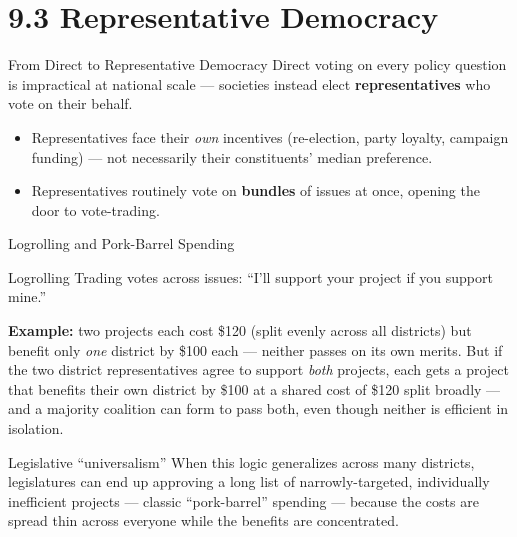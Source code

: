 \documentclass[11pt,aspectratio=169]{beamer}
\begin{document}
\section{9.3 Representative Democracy}

\begin{frame}{From Direct to Representative Democracy}
  Direct voting on every policy question is impractical at national scale --- societies instead elect \textbf{representatives} who vote on their behalf.
  \begin{itemize}
    \item Representatives face their \emph{own} incentives (re-election, party loyalty, campaign funding) --- not necessarily their constituents' median preference.
    \item Representatives routinely vote on \textbf{bundles} of issues at once, opening the door to vote-trading.
  \end{itemize}
\end{frame}

\begin{frame}{Logrolling and Pork-Barrel Spending}
  \begin{block}{Logrolling}
    Trading votes across issues: ``I'll support your project if you support mine.''
  \end{block}
  \small \textbf{Example:} two projects each cost \$120 (split evenly across all districts) but benefit only \emph{one} district by \$100 each --- neither passes on its own merits. But if the two district representatives agree to support \emph{both} projects, each gets a project that benefits their own district by \$100 at a shared cost of \$120 split broadly --- and a majority coalition can form to pass both, even though neither is efficient in isolation.
  \begin{alertblock}{Legislative ``universalism''}
    When this logic generalizes across many districts, legislatures can end up approving a long list of narrowly-targeted, individually inefficient projects --- classic ``pork-barrel'' spending --- because the costs are spread thin across everyone while the benefits are concentrated.
  \end{alertblock}
\end{frame}
\end{document}

